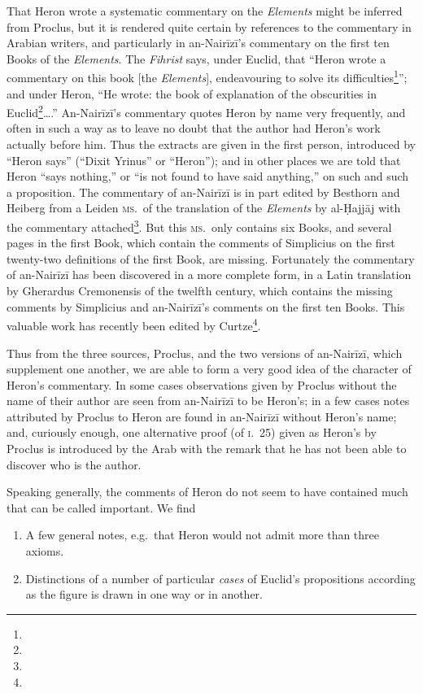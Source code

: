 That Heron wrote a systematic commentary on the \emph{Elements} might be inferred from Proclus, but it is rendered quite certain by references to the commentary in Arabian writers, and particularly in an-Nairīzī's commentary on the first ten Books of the \emph{Elements}. The \emph{Fihrist} says, under Euclid, that ``Heron wrote a commentary on this book [the \emph{Elements}], endeavouring to solve its difficulties\footnote{}''; and under Heron, ``He wrote: the book of explanation of the obscurities in Euclid\footnote{}\dots.'' An-Nairīzī's commentary quotes Heron by name very frequently, and often in such a way as to leave no doubt that the author had Heron's work actually before him. Thus the extracts are given in the first person, introduced by ``Heron says'' (``Dixit Yrinus'' or ``Heron''); and in other places we are told that Heron ``says nothing,'' or ``is not found to have said anything,'' on such and such a proposition. The commentary of an-Nairīzī is in part edited by Besthorn and Heiberg from a Leiden \textsc{ms.}\ of the translation of the \emph{Elements} by al-Ḥajjāj with the commentary attached\footnote{}. But this \textsc{ms.}\ only contains six Books, and several pages in the first Book, which contain the comments of Simplicius on the first twenty-two definitions of the first Book, are missing. Fortunately the commentary of an-Nairīzī has been discovered in a more complete form, in a Latin translation by Gherardus Cremonensis of the twelfth century, which contains the missing comments by Simplicius and an-Nairīzī's comments on the first ten Books. This valuable work has recently been edited by Curtze\footnote{}.

Thus from the three sources, Proclus, and the two versions of an-Nairīzī, which supplement one another, we are able to form a very good idea of the character of Heron's commentary. In some cases observations given by Proclus without the name of their author are seen from an-Nairīzī to be Heron's; in a few cases notes attributed by Proclus to Heron are found in an-Nairīzī without Heron's name; and, curiously enough, one alternative proof (of \textsc{i}.~25) given as Heron's by Proclus is introduced by the Arab with the remark that he has not been able to discover who is the author.

Speaking generally, the comments of Heron do not seem to have contained much that can be called important. We find

\begin{enumerate}[label=(\arabic*)]
	\item A few general notes, e.g.\ that Heron would not admit more than three axioms.
	\item Distinctions of a number of particular \emph{cases} of Euclid's propositions according as the figure is drawn in one way or in another.
\end{enumerate}

